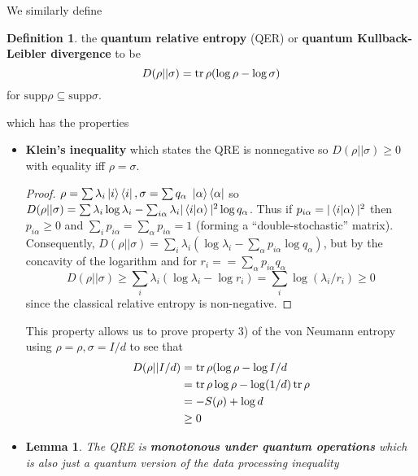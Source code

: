 \documentclass{article}
\newtheorem{lemma}{Lemma}
\theoremstyle{definition}
\newtheorem{definition}{Definition}
\begin{document}
We similarly define
\begin{definition}
  the \textbf{quantum relative entropy} (QER) or \textbf{quantum Kullback-
  Leibler divergence} to be 
  \begin{equation}
    D(\rho || \sigma) = \tr \rho (\log \rho - \log \sigma)
  \end{equation}
  for $\text{supp} \rho \subseteq \text{supp} \sigma$.
\end{definition}
which has the properties
\begin{itemize}
  \item \textbf{Klein's inequality} which states the QRE is nonnegative so
    $D(\rho || \sigma) \geq 0$ with equality iff $\rho = \sigma$.
    \begin{proof}
      $\rho = \sum \lambda_i \ket{i} \bra{i}, \sigma = \sum q_\alpha\
      \ket{\alpha} \bra{\alpha}$ so $D(\rho || \sigma) = \sum \lambda_i \log
      \lambda_i - \sum_{i\alpha} \lambda_i |\bra{i} \ket{\alpha}|^2 \log 
      q_\alpha$. Thus if $p_{i\alpha} = |\bra{i} \ket{\alpha}|^2$ then 
      $p_{i\alpha} \geq 0$ and $\sum_i p_{i\alpha} = \sum_\alpha p_{i\alpha}
      = 1$ (forming a ``double-stochastic'' matrix). Consequently, 
      $D(\rho || \sigma) = \sum_i \lambda_i (\log \lambda_i - \sum_\alpha
      p_{i \alpha} \log q_\alpha)$, but by the concavity of the logarithm and 
      for $r_i == \sum_\alpha p_{i \alpha} q_\alpha$
      \begin{equation}
        D(\rho || \sigma) \geq \sum_i \lambda_i (\log \lambda_i - \log r_i)
        = \sum_i \log (\lambda_i / r_i) \geq 0
      \end{equation}
      since the classical relative entropy is non-negative.
    \end{proof}
    This property allows us to prove property 3) of the von Neumann entropy
    using $\rho = \rho, \sigma = I / d$ to see that
    \begin{align*}
      D(\rho || I / d)
      &= \tr \rho (\log \rho - \log I /d \\
      &= \tr \rho \log \rho - \log (1/d) \tr \rho \\
      &= -S(\rho) + \log d \\
      &\geq 0
    \end{align*}
  \item
    \begin{lemma}
      The QRE is \textbf{monotonous under quantum operations} which is also just
      a quantum version of the data processing inequality
      \begin{equation}

\end{equation}
\end{lemma}
\end{itemize}
\end{document}
